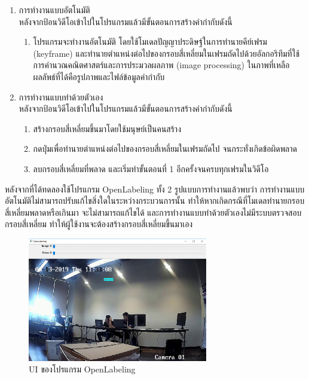 \begin{enumerate}
	\setlength\itemsep{-0.25em}
	\item การทำงานแบบอัตโนมัติ 
	\\ หลังจากป้อนวิดีโอเข้าไปในโปรแกรมแล้วมีขั้นตอนการสร้างคำกำกับดังนี้ 
   	\begin{enumerate}
	\setlength\itemsep{-0.25em}
		\item โปรแกรมจะทำงานอัตโนมัติ โดยใช้โมเดลปัญญาประดิษฐ์ในการทำนายคีย์เฟรม (keyframe) 
		และทำนายตำแหน่งต่อไปของกรอบสี่เหลี่ยมในเฟรมถัดไปด้วยอัลกอริทึมที่ใช้การคำนวณคณิตศาสตร์และการประมวลผลภาพ (image processing) ในภาพที่เหลือ ผลลัพธ์ที่ได้คือรูปภาพและไฟล์ข้อมูลคำกำกับ
 	\end{enumerate}
	\item การทำงานแบบทำด้วยตัวเอง 
	\\ หลังจากป้อนวิดีโอเข้าไปในโปรแกรมแล้วมีขั้นตอนการสร้างคำกำกับดังนี้ 
	\begin{enumerate}
	\setlength\itemsep{-0.25em}
		\item สร้างกรอบสี่เหลี่ยมขึ้นมาโดยใช้มนุษย์เป็นคนสร้าง
		\item กดปุ่มเพื่อทำนายตำแหน่งต่อไปของกรอบสี่เหลี่ยมในเฟรมถัดไป จนกระทั่งเกิดข้อผิดพลาด
		\item ลบกรอบสี่เหลี่ยมที่พลาด และเริ่มทำขั้นตอนที่ 1 อีกครั้งจนครบทุกเฟรมในวิดีโอ
 	\end{enumerate}
 \end{enumerate}
หลังจากที่ได้ทดลองใช้โปรแกรม OpenLabeling ทั้ง 2 รูปแบบการทำงานแล้วพบว่า การทำงานแบบอัตโนมัติไม่สามารถปรับแก้ไขสิ่งใดในระหว่างกระบวนการนั้น 
ทำให้หากเกิดกรณีที่โมเดลทำนายกรอบสี่เหลี่ยมพลาดหรือเกินมา จะไม่สามารถแก้ไขได้ และการทำงานแบบทำด้วยตัวเองไม่มีระบบตรวจสอบกรอบสี่เหลี่ยม ทำให้ผู้ใช้งานจะต้องสร้างกรอบสี่เหลี่ยมขึ้นมาเอง

\begin{figure}[!ht]
	\centering
	\includegraphics[width=0.7\textwidth]{chapter2/images/openlabel.png}
		\caption{UI ของโปรแกรม OpenLabeling}
    	\label{fig:openlabel}
\end{figure}



